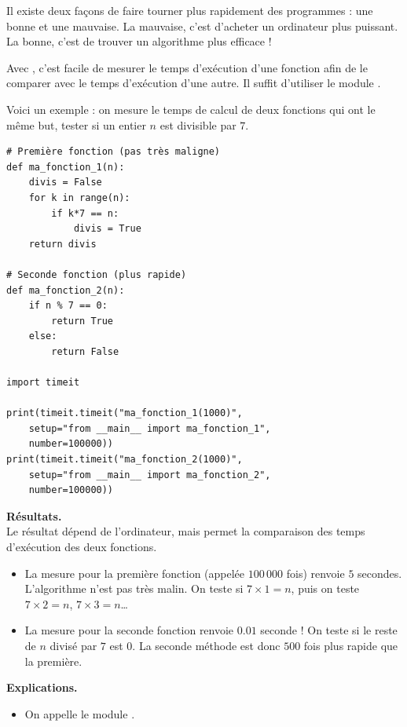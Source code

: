 \documentclass[11pt,class=report,crop=false]{standalone}
\begin{document}
\begin{cours}

Il existe deux façons de faire tourner plus rapidement des programmes : une bonne et une mauvaise. La mauvaise, c'est d'acheter un ordinateur plus puissant.
La bonne, c'est de trouver un algorithme plus efficace !

Avec \Python, c'est facile de mesurer le temps d'exécution d'une fonction afin de le comparer avec le temps d'exécution d'une autre. Il suffit d'utiliser le module .


Voici un exemple : on mesure le temps de calcul de deux fonctions qui ont le même but, tester si un entier $n$ est divisible par $7$.

\begin{lstlisting}  
# Première fonction (pas très maligne)
def ma_fonction_1(n):
    divis = False
    for k in range(n):
        if k*7 == n:
            divis = True
    return divis

# Seconde fonction (plus rapide)
def ma_fonction_2(n):
    if n % 7 == 0:
        return True
    else:
        return False

import timeit

print(timeit.timeit("ma_fonction_1(1000)", 
    setup="from __main__ import ma_fonction_1", 
    number=100000))
print(timeit.timeit("ma_fonction_2(1000)", 
    setup="from __main__ import ma_fonction_2", 
    number=100000))
\end{lstlisting} 


\textbf{Résultats.} \\
Le résultat dépend de l'ordinateur, mais permet la comparaison des temps d'exécution des deux fonctions.
\begin{itemize}
  \item La mesure pour la première fonction (appelée $100\,000$ fois)  renvoie $5$ secondes. L'algorithme n'est pas très malin. On teste
  si $7\times 1 =n$, puis on teste $7\times 2 = n$, $7\times 3 = n$\ldots
  
  \item La mesure pour la seconde fonction renvoie $0.01$ seconde ! On teste si le reste de $n$ divisé par $7$ est $0$. La seconde méthode est donc $500$ fois plus rapide que la première.
\end{itemize}  

\medskip

\textbf{Explications.}
\begin{itemize}
  \item On appelle le module .
    

\end{itemize}
\end{cours}
\end{document}
